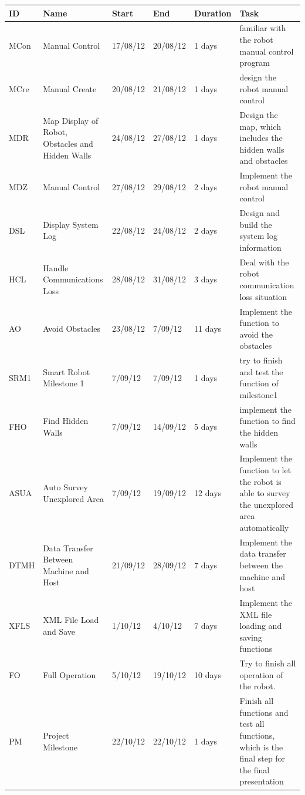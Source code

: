 \documentclass[11pt, a4paper]{report}
\begin{document}
 \pagebreak
\begin{tabular}{|p{2cm}|p{3cm}|p{2cm}|p{2cm}|p{2cm}|p{3cm}|}%
\hline
ID	&	Name	&	Start	&	End	&	Duration  & 	Task  \\ \hline
MCon		&	Manual Control 	&  17/08/12	&	20/08/12	& 1 days	&	familiar with the robot manual control program \\  \hline
MCre		&	Manual Create 	&  20/08/12	&	21/08/12	& 1 days	& design the robot manual control	 \\  \hline
MDR		&	Map Display of Robot, Obstacles and Hidden Walls 	&  24/08/12	&	27/08/12	& 1 days	&	Design the map, which includes the hidden walls and obstacles \\  \hline
MDZ	&	Manual Control 	&  27/08/12	&	29/08/12	& 2 days	&	Implement the robot manual control \\  \hline
DSL		&	Display System Log	&  22/08/12	&	24/08/12	& 2 days	&	Design and build the system log information \\  \hline
HCL		&	Handle Communications Loss	&  28/08/12	&	31/08/12	& 3 days	&	Deal with the robot communication loss situation \\  \hline
AO	&	Avoid Obstacles	&  23/08/12	&	7/09/12	& 11 days	&	Implement the function to avoid the obstacles \\  \hline
SRM1	&	 Smart Robot Milestone 1	&  7/09/12	&	7/09/12	& 1 days	&	try to finish and test the function of milestone1 \\  \hline
FHO	&	Find Hidden Walls 	&  7/09/12	&	14/09/12	& 5 days	& implement the function to find the hidden walls	 \\  \hline
ASUA	&	Auto Survey Unexplored Area 	&  7/09/12	&	19/09/12	& 12 days	&	Implement the function to let the robot is able to survey the unexplored area automatically \\  \hline

DTMH	&	Data Transfer Between Machine and Host  	&  21/09/12	&	28/09/12	& 7 days	&	Implement the data transfer between the machine and host \\  \hline
XFLS	&	 XML File Load and Save 	&  1/10/12	&	4/10/12	& 7 days	&	Implement the XML file loading and saving functions \\  \hline
FO	&	 Full Operation 	&  5/10/12	&	19/10/12	& 10 days	&	Try to finish all operation of the robot. \\  \hline
PM	&	Project Milestone 	&  22/10/12	&	22/10/12	& 1 days	&	Finish all functions and test all functions, which is the final step for the final presentation  \\  \hline
\end{tabular}
\end{document}
